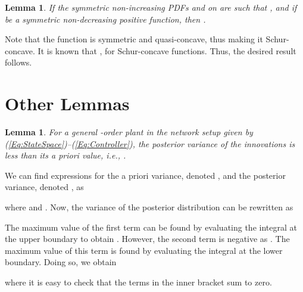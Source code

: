 \documentclass[twocolumn]{autart}
\newtheorem{lemma}[theorem]{Lemma}
\newenvironment{proof}[1][Proof]{\begin{trivlist}
\item[\hskip \labelsep {\bfseries #1}]}{\end{trivlist}}
\renewcommand{\qed}{}
\begin{document}
\begin{lemma} \label{Lemma:Maj4}
If the symmetric non-increasing PDFs  and  on  are such that , and if  be a symmetric non-decreasing positive function, then .
\end{lemma}
\begin{proof}
Note that the function  is symmetric and quasi-concave, thus making it Schur-concave. It is known that , for Schur-concave functions. Thus, the desired result follows. \hfill \qed
\end{proof}

\section{Other Lemmas}

\begin{lemma} \label{Lemma:ReducedVariance}
For a general -order plant in the network setup given by (\ref{Eq:StateSpace})--(\ref{Eq:Controller}), the posterior variance of the innovations is less than its a priori value, i.e., .
\end{lemma}
\begin{proof}
We can find expressions for the a priori variance, denoted , and the posterior variance, denoted  , as

where  and . Now, the variance of the posterior distribution can be rewritten as

The maximum value of the first term can be found by evaluating the integral at the upper boundary to obtain . However, the second term is negative as . The maximum value of this term is found by evaluating the integral at the lower boundary. Doing so, we obtain

where it is easy to check that the terms in the inner bracket sum to zero. \hfill \qed
\end{proof}
\end{document}
